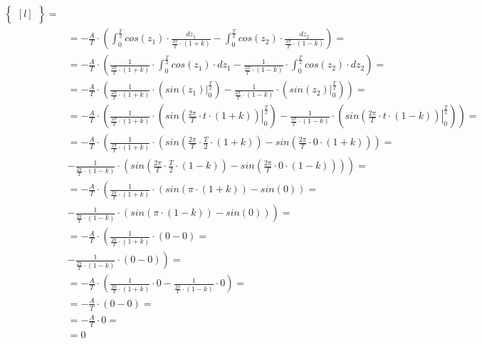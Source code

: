 \begin{task}
\begin{align*}
\begin{Bmatrix*}[l]
\end{Bmatrix*}=\\
&=-\frac{A}{T} \cdot \left(\int_{0}^{\frac{T}{2}} cos\left( z_1 \right)\cdot \frac{dz_1}{\frac{2\pi}{T} \cdot \left(1+k\right)}  - \int_{0}^{\frac{T}{2}} cos\left( z_2\right) \cdot \frac{dz_2}{\frac{2\pi}{T} \cdot \left(1-k\right)}\right)=\\
&=-\frac{A}{T} \cdot \left(\frac{1}{\frac{2\pi}{T}\cdot \left(1+k\right)} \cdot \int_{0}^{\frac{T}{2}} cos\left( z_1 \right)\cdot dz_1 - \frac{1}{\frac{2\pi}{T} \cdot \left(1-k\right)} \cdot \int_{0}^{\frac{T}{2}} cos\left( z_2\right) \cdot dz_2 \right)=\\
&=-\frac{A}{T} \cdot \left(\frac{1}{\frac{2\pi}{T}\cdot \left(1+k\right)} \cdot \left( \left. sin\left( z_1 \right) \right|_{0}^{\frac{T}{2}} \right) - \frac{1}{\frac{2\pi}{T} \cdot \left(1-k\right)} \cdot \left(\left. sin\left( z_2\right) \right|_{0}^{\frac{T}{2}} \right) \right)=\\
&=-\frac{A}{T} \cdot \left(\frac{1}{\frac{2\pi}{T}\cdot \left(1+k\right)} \cdot \left( \left. sin\left( \frac{2\pi}{T} \cdot t \cdot \left(1+k\right) \right) \right|_{0}^{\frac{T}{2}} \right) - \frac{1}{\frac{2\pi}{T} \cdot \left(1-k\right)} \cdot \left(\left. sin\left( \frac{2\pi}{T} \cdot t \cdot \left(1-k\right)\right) \right|_{0}^{\frac{T}{2}} \right) \right)=\\
&=-\frac{A}{T} \cdot \left(\frac{1}{\frac{2\pi}{T}\cdot \left(1+k\right)} \cdot \left( sin\left( \frac{2\pi}{T} \cdot \frac{T}{2} \cdot \left(1+k\right) \right) - sin\left( \frac{2\pi}{T} \cdot 0 \cdot \left(1+k\right) \right) \right) \right.=\\
&\left.- \frac{1}{\frac{2\pi}{T} \cdot \left(1-k\right)} \cdot \left( sin\left( \frac{2\pi}{T} \cdot \frac{T}{2} \cdot \left(1-k\right)\right) -  sin\left( \frac{2\pi}{T} \cdot 0 \cdot \left(1-k\right)\right) \right) \right)=\\
&=-\frac{A}{T} \cdot \left(\frac{1}{\frac{2\pi}{T}\cdot \left(1+k\right)} \cdot \left( sin\left(\pi \cdot \left(1+k\right) \right) - sin\left( 0 \right) \right) \right.=\\
&\left.- \frac{1}{\frac{2\pi}{T} \cdot \left(1-k\right)} \cdot \left( sin\left(\pi \cdot \left(1-k\right)\right) -  sin\left( 0 \right) \right) \right)=\\
&=-\frac{A}{T} \cdot \left(\frac{1}{\frac{2\pi}{T}\cdot \left(1+k\right)} \cdot \left( 0 - 0 \right) \right.=\\
&\left.- \frac{1}{\frac{2\pi}{T} \cdot \left(1-k\right)} \cdot \left( 0 -  0 \right) \right)=\\
&=-\frac{A}{T} \cdot \left(\frac{1}{\frac{2\pi}{T}\cdot \left(1+k\right)} \cdot 0 - \frac{1}{\frac{2\pi}{T} \cdot \left(1-k\right)} \cdot 0 \right)=\\
&=-\frac{A}{T} \cdot \left(0 - 0 \right)=\\
&=-\frac{A}{T} \cdot 0=\\
&=0
\end{align*}


\end{task}
